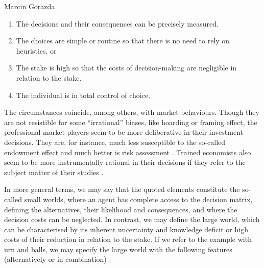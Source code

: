 \begin{artengenv}{Marcin Gorazda}
\begin{enumerate}
\item The decisions and their consequences can be precisely measured.
\item The choices are simple or routine so that there is no need to rely on heuristics, or
\item The stake is high so that the costs of decision-making are negligible in relation to the stake.
\item The individual is in total control of choice.
\end{enumerate}
The circumstances coincide, among others, with market behaviours. Though they are not resistible for some ``irrational'' biases, like hoarding or framing effect, the professional market players seem to be more deliberative in their investment decisions. They are, for instance, much less susceptible to the so-called endowment effect and much better is risk assessment
\parencite[][]{arlen_experimental_2008}. %
 Trained economists also seem to be more instrumentally rational in their decisions if they refer to the subject matter of their studies 
\parencite[][]{frank_does_1993}.%


In more general terms, we may say that the quoted elements constitute the so-called small worlds, where an agent has complete access to the decision matrix, defining the alternatives, their likelihood and consequences, and where the decision costs can be neglected. In contrast, we may define the large world, which can be characterised by its inherent uncertainty and knowledge deficit or high costs of their reduction in relation to the stake. If we refer to the example with urn and balls, we may specify the large world with the following features (alternatively or in combination)
\parencite[][]{gigerenzer_homo_2009}:%



\end{artengenv}
